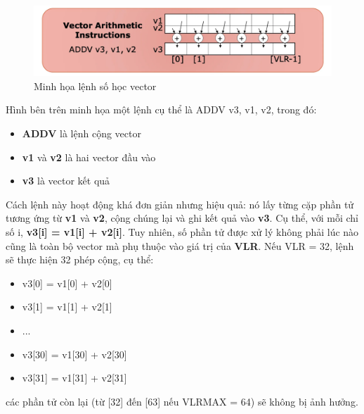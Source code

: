 \documentclass[a4paper]{article}
\begin{document}
\begin{figure}[H]
    \centering
    \includegraphics[width=1\linewidth]{assets/vector-arithmetic-instructions.png}
    \caption{Minh họa lệnh số học vector}
    \label{fig:enter-label}
\end{figure}

Hình bên trên minh họa một lệnh cụ thể là ADDV v3, v1, v2, trong đó:

\begin{itemize}
    \item \textbf{ADDV} là lệnh cộng vector
    \item \textbf{v1} và \textbf{v2} là hai vector đầu vào 
    \item \textbf{v3} là vector kết quả
\end{itemize}
Cách lệnh này hoạt động khá đơn giản nhưng hiệu quả: nó lấy từng cặp phần tử tương ứng từ \textbf{v1} và \textbf{v2}, cộng chúng lại và ghi kết quả vào \textbf{v3}. Cụ thể, với mỗi chỉ số i, \textbf{v3[i] = v1[i] + v2[i]}. Tuy nhiên, số phần tử được xử lý không phải lúc nào cũng là toàn bộ vector mà phụ thuộc vào giá trị của \textbf{VLR}. Nếu VLR = 32, lệnh sẽ thực hiện 32 phép cộng, cụ thể:
\begin{itemize}
    \item v3[0] = v1[0] + v2[0]
    \item v3[1] = v1[1] + v2[1]
    \item ...
    \item v3[30] = v1[30] + v2[30]
    \item v3[31] = v1[31] + v2[31]
\end{itemize}
các phần tử còn lại (từ [32] đến [63] nếu VLRMAX = 64) sẽ không bị ảnh hưởng.
\end{document}
